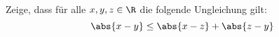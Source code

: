 \begin{exercise}[Dreiecksungleichung]
  Zeige, dass für alle $x, y, z \in \R$ die folgende Ungleichung gilt:
  \[
    \abs{x - y}
    \leq
    \abs{x - z} + \abs{z - y}
  \]
\end{exercise}
